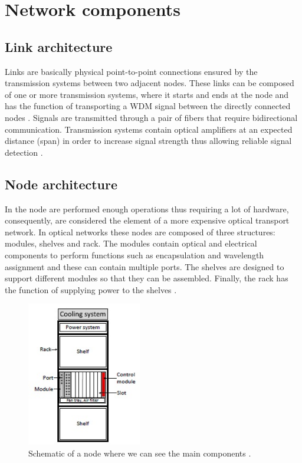 \clearpage

\section{Network components}\label{network_components}

\subsection{Link architecture}

Links are basically physical point-to-point connections ensured by the transmission systems between two adjacent nodes.
These links can be composed of one or more transmission systems, where it starts and ends at the node and has the function of transporting a WDM signal between the directly connected nodes \cite{book07}\cite{ramas2010}. Signals are transmitted through a pair of fibers that require bidirectional communication.
Transmission systems contain optical amplifiers at an expected distance (span) in order to increase signal strength thus allowing reliable signal detection \cite{tesevasco}.

\subsection{Node architecture}

In the node are performed enough operations thus requiring a lot of hardware, consequently, are considered the element of a more expensive optical transport network.
In optical networks these nodes are composed of three structures: modules, shelves and rack. The modules contain optical and electrical components to perform functions such as encapsulation and wavelength assignment and these can contain multiple ports. The shelves are designed to support different modules so that they can be assembled. Finally, the rack has the function of supplying power to the shelves \cite{tesevasco,teserui}.

\begin{figure}[h!]
\centering
\includegraphics[width=5cm]{sdf/reference_network/figures/node}
\caption{Schematic of a node where we can see the main components \cite{teserui,tesevasco}.}
\label{node_struct}
\end{figure}

